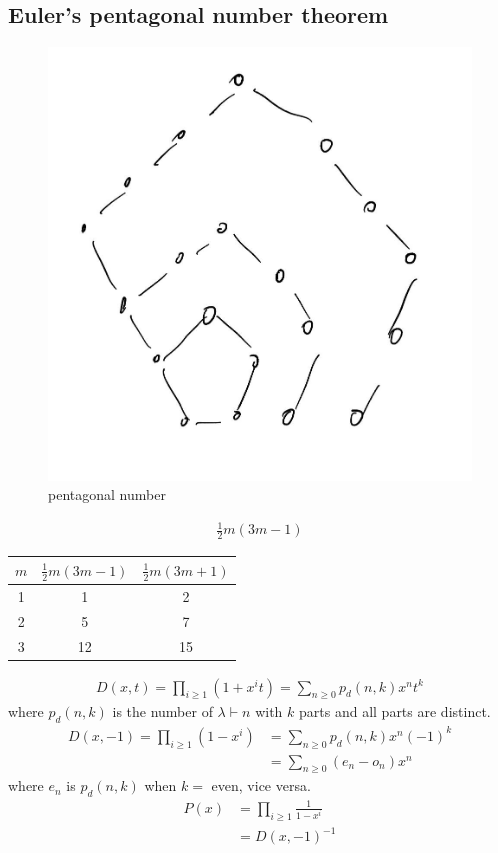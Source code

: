 \documentclass{article}
\theoremstyle{definition}
\begin{document}
\subsection*{Euler's pentagonal number theorem}
\begin{figure}[!h]
    \centerline{\includegraphics[width=0.5\columnwidth]{pentagonal_number.jpg}}
    \caption{pentagonal number}
    \label{pentagonal number} 
\end{figure}
\begin{align*}
    \frac{1}{2}m (3m-1)
\end{align*}
\begin{center}
    \begin{tabular}{c|c|c}
        $m$ & $\frac{1}{2} m (3m-1)$ & $\frac{1}{2}m(3m+1)$ \\ 
        \hline 
        1 & 1 & 2 \\
        2 & 5 & 7 \\
        3 & 12 & 15
    \end{tabular}
\end{center}
\begin{align*}
    D(x, t) = \prod_{i \ge 1} (1+ x^i t) = \sum_{n \ge 0 } p_d (n, k) x^n t^k
\end{align*}
where $p_d (n, k)$ is the number of $\lambda \vdash n $ with $k$ parts and all 
parts are distinct.
\begin{align*}
    D(x, -1) = \prod_{i\ge 1} (1 - x^i) &
    = \sum_{n \ge 0} p_d(n, k) x^n (-1)^k \\ 
    &= \sum_{n \ge 0} (e_n - o_n) x^n
\end{align*}
where $e_n$ is $p_d(n,k)$ when $k = $ even, vice versa. 
\begin{align*}
    P(x) &= \prod_{i\ge 1} \frac{1}{1-x^i}  \\ 
    &= D(x, -1)^{-1}
\end{align*}
\end{document}
